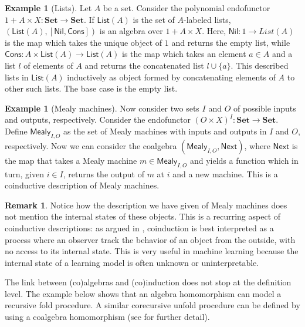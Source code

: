 \documentclass[11pt,a4paper,openright,twoside]{report}
\theoremstyle{plain}
\theoremstyle{definition}
\newtheorem{remark}[proposition]{Remark}
\newtheorem{example}[proposition]{Example}
\begin{document}
\begin{example}[Lists]
  \label{ex: lists}
  Let $A$ be a set. Consider the polynomial endofunctor $1 + A \times X: \mathbf{Set} \to \mathbf{Set}$. If $\mathsf{List}(A)$ is the set of $A$-labeled lists, $(\mathsf{List}(A), [\mathsf{Nil}, \mathsf{Cons}])$ is an algebra over $1 + A \times X$. Here, $\mathsf{Nil}: 1 \to {List}(A)$ is the map which takes the unique object of $1$ and returns the empty list, while $\mathsf{Cons}: A \times \mathsf{List}(A) \to \mathsf{List}(A)$ is the map which takes an element $a \in A$ and a list $l$ of elements of $A$ and returns the concatenated list $l \cup \{a\}$. This described lists in $\mathsf{List}(A)$ inductively as object formed by concatenating elements of $A$ to other such lists. The base case is the empty list.
\end{example}

\begin{example}[Mealy machines]
  \label{ex: mealy}
  Now consider two sets $I$ and $O$ of possible inputs and outputs, respectively. Consider the endofunctor $(O \times X)^I: \mathbf{Set} \to \mathbf{Set}$.  Define $\mathsf{Mealy}_{I,O}$ as the set of Mealy machines with inputs and outputs in $I$ and $O$, respectively. Now we can consider the coalgebra $(\mathsf{Mealy}_{I,O}, \mathsf{Next})$, where $\mathsf{Next}$ is the map that takes a Mealy machine $m \in \mathsf{Mealy}_{I,O}$ and yields a function which in turn, given $i \in I$, returns the output of $m$ at $i$ and a new machine. This is a coinductive description of Mealy machines.
\end{example}

\begin{remark}
  Notice how the description we have given of Mealy machines does not mention the internal states of these objects. This is a recurring aspect of coinductive descriptions: as argued in \cite{jacobs1997tutorial}, coinduction is best interpreted as a process where an observer track the behavior of an object from the outside, with no access to its internal state. This is very useful in machine learning because the internal state of a learning model is often unknown or uninterpretable.
\end{remark}

The link between (co)algebras and (co)induction does not stop at the definition level. The example below shows that an algebra homomorphism can model a recursive fold procedure. A similar corecursive unfold procedure can be defined by using a coalgebra homomorphism (see \cite{gavranovicposition} for further detail).
\end{document}
